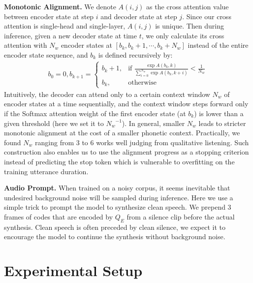 \documentclass[letterpaper]{article} %
\begin{document}
\textbf{Monotonic Alignment.}
We denote $A(i, j)$ as the cross attention value between encoder state at step $i$ and decoder state at step $j$.
Since our cross attention is single-head and single-layer, $A(i, j)$ is unique.
Then during inference, given a new decoder state at time $t$, we only calculate its cross attention with $N_w$ encoder states at $[b_k, b_k+1,\cdots,b_k+N_w]$ instead of the entire encoder state sequence, and $b_k$ is defined recursively by:
\begin{gather}
    b_0 = 0, b_{k+1} = \begin{cases}
    b_k + 1,& \text{if } \frac{\exp{A(b_k, k)}}{\sum_{i=0}^{N_w}\exp{A(b_k, k+i)}} < \frac{1}{N_w}\\
    b_k,              & \text{otherwise}
    \end{cases}
\end{gather}
Intuitively, the decoder can attend only to a certain context window $N_w$ of encoder states at a time sequentially, and the context window steps forward only if the Softmax attention weight of the first encoder state (at $b_k$) is lower than a given threshold (here we set it to ${N_w}^{-1}$).
In general, smaller $N_w$ leads to stricter monotonic alignment at the cost of a smaller phonetic context.
Practically, we found $N_w$ ranging from 3 to 6 works well judging from qualitative listening.
Such construction also enables us to use the alignment progress as a stopping criterion instead of predicting the stop token which is vulnerable to overfitting on the training utterance duration.



\textbf{Audio Prompt.}
When trained on a noisy corpus, it seems inevitable that undesired background noise will be sampled during inference.
Here we use a simple trick to prompt the model to synthesize clean speech.
We prepend 3 frames of codes that are encoded by $Q_{E}$ from a silence clip before the actual synthesis.
Clean speech is often preceded by clean silence, we expect it to encourage the model to continue the synthesis without background noise.

\section{Experimental Setup}
\label{sec:exp-stepup}
\end{document}
